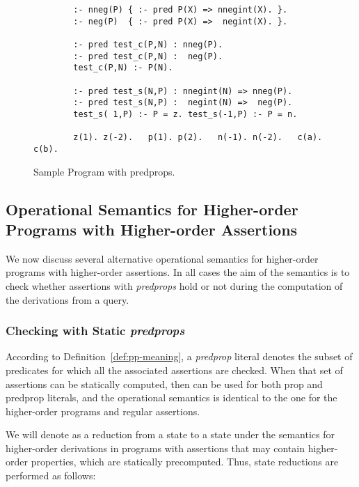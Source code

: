 \documentclass{llncs}
\begin{document}
\begin{figure}
\vspace*{-1mm}
  \centering
    \begin{small}
\begin{verbatim}
        :- nneg(P) { :- pred P(X) => nnegint(X). }.
        :- neg(P)  { :- pred P(X) =>  negint(X). }.

        :- pred test_c(P,N) : nneg(P).
        :- pred test_c(P,N) :  neg(P).
        test_c(P,N) :- P(N).

        :- pred test_s(N,P) : nnegint(N) => nneg(P).
        :- pred test_s(N,P) :  negint(N) =>  neg(P).
        test_s( 1,P) :- P = z. test_s(-1,P) :- P = n.

        z(1). z(-2).   p(1). p(2).   n(-1). n(-2).   c(a). c(b).
\end{verbatim}
    \end{small}
  \caption{Sample Program with predprops.}
  \label{ex:pp-calls}
\vspace*{-1mm}
\vspace*{-4mm}
\end{figure}




\subsection{Operational Semantics for  Higher-order Programs with
Higher-order Assertions}
We now discuss several alternative operational semantics for
higher-order programs with higher-order assertions. In all cases the
aim of the semantics is to check whether assertions with
\emph{predprops} hold or not during the computation of the
derivations from a query.



\subsubsection{Checking with Static \emph{predprops}} 
According to Definition~\ref{def:pp-meaning}, a \emph{predprop}
literal  denotes the subset of predicates for which
all the associated assertions are checked.
When that set of assertions can be statically computed, then  can be used for both prop and predprop 
literals, and the operational semantics is identical
to the one for the higher-order programs and regular assertions.

We will denote as  a reduction from a state 
to a state  under the semantics for higher-order derivations in
programs with assertions that may contain higher-order properties,
which are statically precomputed.
Thus, state reductions are performed as follows:
\end{document}
